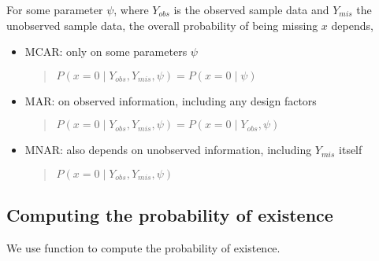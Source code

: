 \documentclass[a4paper,12pt,english]{sphinxhowto}
\begin{document}
For some parameter \(\psi\), where \(Y_{obs}\) is the observed sample data and \(Y_{mis}\) the unobserved sample data,
the overall probability of being missing \(x\) depends,
\begin{itemize}
\item {} 
MCAR: only on some parameters \(\psi\)
\begin{quote}

\(P(x=0 \mid Y_{obs}, Y_{mis}, \psi) = P(x=0 \mid \psi)\)
\end{quote}

\item {} 
MAR: on observed information, including any design factors
\begin{quote}

\(P(x=0 \mid Y_{obs}, Y_{mis}, \psi) = P(x=0 \mid Y_{obs}, \psi)\)
\end{quote}

\item {} 
MNAR: also depends on unobserved information, including \(Y_{mis}\) itself
\begin{quote}

\(P(x=0 \mid Y_{obs}, Y_{mis}, \psi)\)
\end{quote}

\end{itemize}

\begin{quote}




{\hyperref[\detokenize{EDHVariables:ccases}]{}}


\end{quote}



\subsection{Computing the probability of existence}
\label{\detokenize{Uncertainty:computing-the-probability-of-existence}}\label{\detokenize{Uncertainty:cprex}}
We use function  to compute the probability of existence.
\end{document}
